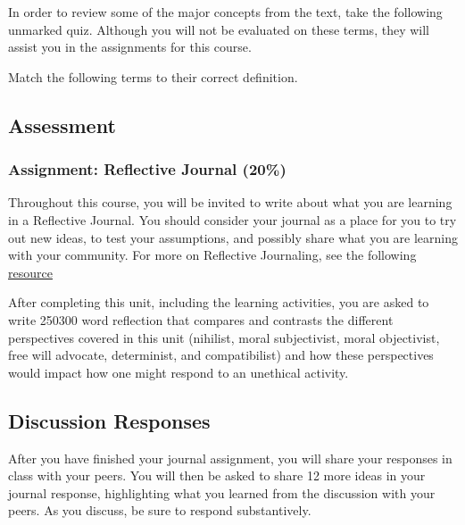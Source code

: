 \documentclass[
]{book}
\begin{document}
In order to review some of the major concepts from the text, take the following
unmarked quiz. Although you will not be evaluated on these terms, they will
assist you in the assignments for this course.

Match the following terms to their correct definition.

\hypertarget{assessment-1}{%
\subsection*{Assessment}\label{assessment-1}}

\begin{assessment}
\hypertarget{assignment-reflective-journal-20}{%
\subsubsection*{Assignment: Reflective Journal (20\%)}\label{assignment-reflective-journal-20}}

Throughout this course, you will be invited to write about what you are learning
in a Reflective Journal. You should consider your journal as a place for you to
try out new ideas, to test your assumptions, and possibly share what you are
learning with your community. For more on Reflective Journaling, see the
following \href{assets/unit_2/Reflective_Journaling.pdf}{resource}

After completing this unit, including the learning activities, you are asked to write 250300 word reflection that compares and contrasts the different perspectives covered in this unit (nihilist, moral subjectivist, moral objectivist, free will advocate, determinist, and compatibilist) and how these perspectives would impact how one might respond to an unethical activity.

\hypertarget{discussion-responses}{%
\subsection*{Discussion Responses}\label{discussion-responses}}

After you have finished your journal assignment, you will share your responses in class with your peers. You will then be asked to share 12 more ideas in your journal response, highlighting what you learned from the discussion with your peers.
As you discuss, be sure to respond substantively.


\end{assessment}
\end{document}
